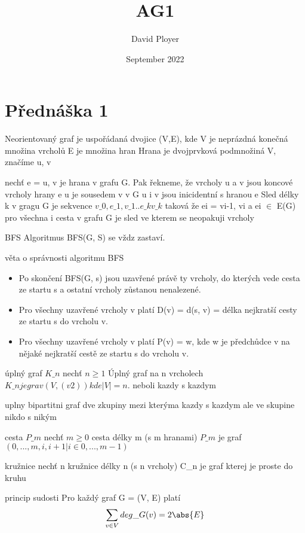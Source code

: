 \documentclass{article}
\title{AG1}
\author{David Ployer}
\date{September 2022}
\begin{document}
\maketitle
\section{Přednáška 1}
Neorientovaný graf je uspořádaná dvojice (V,E), kde 
	V je neprázdná konečná množina vrcholů
	E je množina hran
Hrana je dvojprvková podmnožiná V, značíme {u, v}

nechť e = {u, v}  je hrana v grafu G. Pak řekneme, že 
	vrcholy u a v jsou koncové vrcholy hrany e
	u je sousedem v v G
	u i v jsou inicidentní s hranou e
Sled délky k v gragu G je sekvence $v\_0, e\_1, v\_1 .. e\_kv\_k$ taková  že ei = {vi-1, vi} a ei $\in$ E(G) pro všechna i
cesta v grafu G je sled ve kterem se neopakuji vrcholy

BFS
	Algoritmus BFS(G, S) se vždz zastaví.
	
	věta o správnosti algoritmu BFS
\begin{itemize}
	\item Po skončení BFS(G, s) jsou uzavřené právě ty vrcholy,
	do kterých vede cesta ze startu s a ostatní vrcholy
zůstanou nenalezené.

	\item Pro všechny uzavřené vrcholy v platí D(v) = d(s, v) =
	délka nejkratší cesty ze startu s do vrcholu v.

	\item Pro všechny uzavřené vrcholy v platí P(v) = w, kde w
	je předchůdce v na nějaké nejkratší cestě ze startu s do
vrcholu v.
\end{itemize}

úplný graf $K\_{n}$
nechť $n \geq 1$
Úplný graf na n vrcholech $K\_n je grav (V, (v2)) kde |V| = n$.
neboli kazdy s kazdym

uplny bipartitni graf
dve zkupiny mezi kterýma kazdy s kazdym ale ve skupine nikdo s nikým

cesta $P\_m$
nechť $m \geq 0$ 
cesta délky m (s m hranami) $P\_m$ je graf 
$({0, ... , m}, {{i, i + 1} | i \in {0, ... , m − 1}})$


kružnice 
nechť n 
kružnice délky n (s n vrcholy) C\_n je graf kterej je proste do kruhu

princip sudosti 
Pro každý graf G = (V, E) platí
$$\sum_{v \in V}deg\_{G}(v) = 2\abs{E} $$
\end{document}
